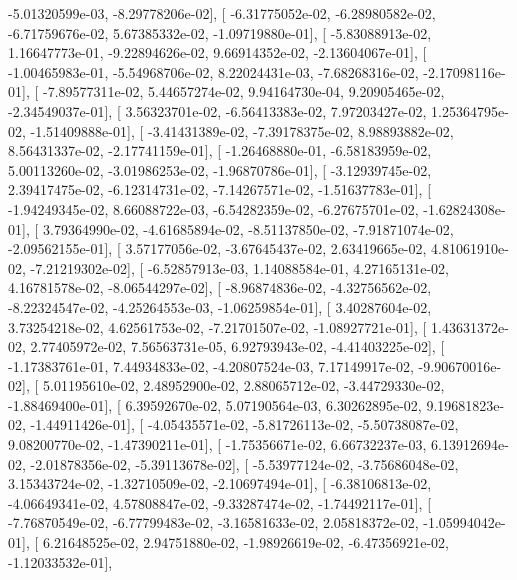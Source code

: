 \documentclass{article}
\begin{document}
         -5.01320599e-03,  -8.29778206e-02],
       [ -6.31775052e-02,  -6.28980582e-02,  -6.71759676e-02,
          5.67385332e-02,  -1.09719880e-01],
       [ -5.83088913e-02,   1.16647773e-01,  -9.22894626e-02,
          9.66914352e-02,  -2.13604067e-01],
       [ -1.00465983e-01,  -5.54968706e-02,   8.22024431e-03,
         -7.68268316e-02,  -2.17098116e-01],
       [ -7.89577311e-02,   5.44657274e-02,   9.94164730e-04,
          9.20905465e-02,  -2.34549037e-01],
       [  3.56323701e-02,  -6.56413383e-02,   7.97203427e-02,
          1.25364795e-02,  -1.51409888e-01],
       [ -3.41431389e-02,  -7.39178375e-02,   8.98893882e-02,
          8.56431337e-02,  -2.17741159e-01],
       [ -1.26468880e-01,  -6.58183959e-02,   5.00113260e-02,
         -3.01986253e-02,  -1.96870786e-01],
       [ -3.12939745e-02,   2.39417475e-02,  -6.12314731e-02,
         -7.14267571e-02,  -1.51637783e-01],
       [ -1.94249345e-02,   8.66088722e-03,  -6.54282359e-02,
         -6.27675701e-02,  -1.62824308e-01],
       [  3.79364990e-02,  -4.61685894e-02,  -8.51137850e-02,
         -7.91871074e-02,  -2.09562155e-01],
       [  3.57177056e-02,  -3.67645437e-02,   2.63419665e-02,
          4.81061910e-02,  -7.21219302e-02],
       [ -6.52857913e-03,   1.14088584e-01,   4.27165131e-02,
          4.16781578e-02,  -8.06544297e-02],
       [ -8.96874836e-02,  -4.32756562e-02,  -8.22324547e-02,
         -4.25264553e-03,  -1.06259854e-01],
       [  3.40287604e-02,   3.73254218e-02,   4.62561753e-02,
         -7.21701507e-02,  -1.08927721e-01],
       [  1.43631372e-02,   2.77405972e-02,   7.56563731e-05,
          6.92793943e-02,  -4.41403225e-02],
       [ -1.17383761e-01,   7.44934833e-02,  -4.20807524e-03,
          7.17149917e-02,  -9.90670016e-02],
       [  5.01195610e-02,   2.48952900e-02,   2.88065712e-02,
         -3.44729330e-02,  -1.88469400e-01],
       [  6.39592670e-02,   5.07190564e-03,   6.30262895e-02,
          9.19681823e-02,  -1.44911426e-01],
       [ -4.05435571e-02,  -5.81726113e-02,  -5.50738087e-02,
          9.08200770e-02,  -1.47390211e-01],
       [ -1.75356671e-02,   6.66732237e-03,   6.13912694e-02,
         -2.01878356e-02,  -5.39113678e-02],
       [ -5.53977124e-02,  -3.75686048e-02,   3.15343724e-02,
         -1.32710509e-02,  -2.10697494e-01],
       [ -6.38106813e-02,  -4.06649341e-02,   4.57808847e-02,
         -9.33287474e-02,  -1.74492117e-01],
       [ -7.76870549e-02,  -6.77799483e-02,  -3.16581633e-02,
          2.05818372e-02,  -1.05994042e-01],
       [  6.21648525e-02,   2.94751880e-02,  -1.98926619e-02,
         -6.47356921e-02,  -1.12033532e-01],
\end{document}
